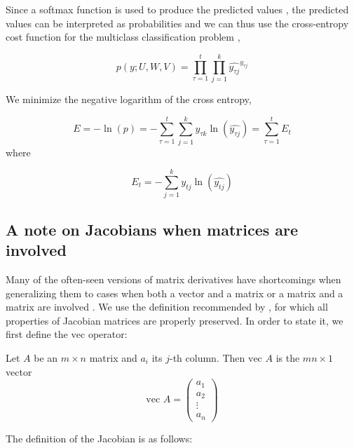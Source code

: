 Since a softmax function is used to produce the predicted values \cite[p. 5]{DBLP:conf/nips/BaHMLI16}, the predicted values can be interpreted as probabilities and we can thus use the cross-entropy cost function for the multiclass classification problem \cite{bishop2006pattern},

\begin{equation*}
p(y; U, W, V) = \prod_{\tau=1}^{t}\prod_{j=1}^{k}\widehat{y_{\tau j}}^{y_{\tau j}}
\end{equation*}

We minimize the negative logarithm of the cross entropy,

\begin{equation*}
  E = -\ln(p) = -\sum_{\tau=1}^t \sum_{j=1}^k y_{\tau k} \ln\left(\widehat{y_{\tau j}}\right) = \sum_{\tau=1}^{t} E_t
\end{equation*}
%
where

\begin{equation*}
  E_t = -\sum_{j=1}^{k} y_{tj} \ln \left(\widehat{y_{tj}}\right)
\end{equation*}

\subsection{A note on Jacobians when matrices are involved}

Many of the often-seen versions of matrix derivatives have shortcomings when generalizing them to cases when both a vector and a matrix or a matrix and a matrix are involved \cite[p. 193-197]{magnus1999matrix}. We use the definition recommended by \citet{magnus1999matrix}, for which all properties of Jacobian matrices are properly preserved. In order to state it, we first define the $\mbox{vec}$ operator:

\begin{definition}
  Let $A$ be an $m \times n$ matrix and $a_i$ its $j$-th column. Then $\mbox{vec } A$ is the $mn \times 1$ vector
  \begin{equation*}
    \mbox{vec } A = \begin{pmatrix}
      a_1 \\ a_2 \\ \vdots \\ a_n
      \end{pmatrix}
  \end{equation*}
  \cite[p. 34]{magnus1999matrix}
\end{definition}

The definition of the Jacobian is as follows:

